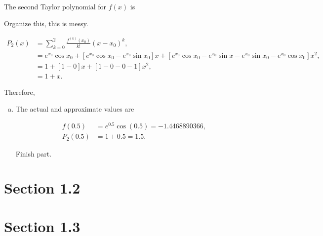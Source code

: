 \documentclass[a4paper, 10pt]{article}
\newenvironment{answer}[1][Answer]{\begin{trivlist}
\item[\hskip\labelsep{\textit{#1.}}]}{\end{trivlist}}
\begin{document}
\begin{answer}
	The second Taylor polynomial for $f(x)$ is

	{\color{blue} Organize this, this is messy.}

	\begin{align*}
		P_2(x) &= \sum_{k=0}^2 \frac{f^{(k)}(x_0)}{k!} (x - x_0)^k,\\
			   &= e^{x_0} \cos{x_0} + \left[ e^{x_0} \cos{x_0} - e^{x_0} \sin{x_0} \right] x + \left[ e^{x_0} \cos{x_0} - e^{x_0} \sin{x} - e^{x_0} \sin{x_0} - e^{x_0} \cos{x_0} \right] x^2,\\
			   &= 1 + \left[ 1 - 0  \right] x + \left[ 1 - 0 - 0 - 1 \right] x^2,\\
			   &= 1 + x.
	\end{align*}

	Therefore, 

	\begin{enumerate}[(a)]
		\item The actual and approximate values are 

			\begin{align*}
				f(0.5) &= e^{0.5} \cos{(0.5)} = - 1.4468890366,\\
				P_2(0.5) &= 1 + 0.5 = 1.5.
			\end{align*}

			{\color{blue} Finish part.}
	\end{enumerate}
\end{answer}

\section{Section 1.2}


\section{Section 1.3}

\end{document}
